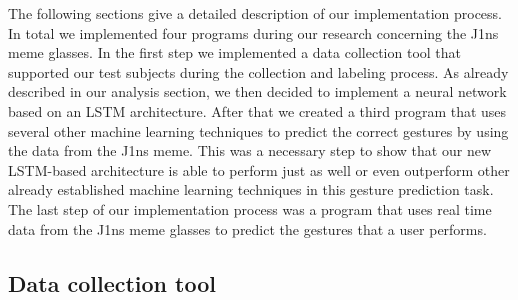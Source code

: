 \documentclass[runningheads]{llncs}
\begin{document}
The following sections give a detailed description of our implementation process. In total we implemented four programs during our research concerning the J1ns meme glasses. In the first step we implemented a data collection tool that supported our test subjects during the collection and labeling process. As already described in our analysis section, we then decided to implement a neural network based on an LSTM architecture. After that we created a third program that uses several other machine learning techniques to predict the correct gestures by using the data from the J1ns meme. This was a necessary step to show that our new LSTM-based architecture is able to perform just as well or even outperform other already established machine learning techniques in this gesture prediction task. The last step of our implementation process was a program that uses real time data from the J1ns meme glasses to predict the gestures that a user performs.

\subsection{Data collection tool}
\end{document}
